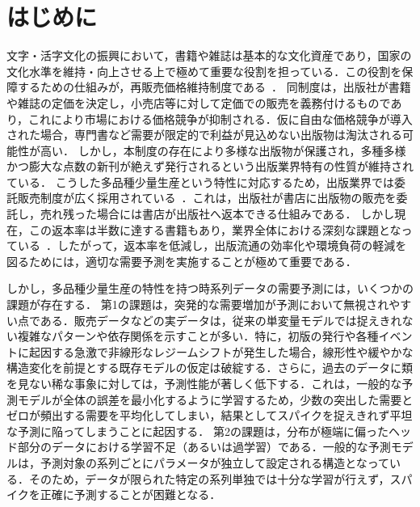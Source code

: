 \documentclass[twocolumn, lastpage]{jarticle}
\begin{document}
\normalsize
\setcounter{page}{1}%
\setcounter{secondpage}{1} %
\maketitle





\section{はじめに}
文字・活字文化の振興において，書籍や雑誌は基本的な文化資産であり，国家の文化水準を維持・向上させる上で極めて重要な役割を担っている．この役割を保障するための仕組みが，再販売価格維持制度である~\cite{JBPA.2001, Kiyota.2002}．
同制度は，出版社が書籍や雑誌の定価を決定し，小売店等に対して定価での販売を義務付けるものであり，これにより市場における価格競争が抑制される．仮に自由な価格競争が導入された場合，専門書など需要が限定的で利益が見込めない出版物は淘汰される可能性が高い．
しかし，本制度の存在により多様な出版物が保護され，多種多様かつ膨大な点数の新刊が絶えず発行されるという出版業界特有の性質が維持されている．
こうした多品種少量生産という特性に対応するため，出版業界では委託販売制度が広く採用されている~\cite{Shimomura.2005}．これは，出版社が書店に出版物の販売を委託し，売れ残った場合には書店が出版社へ返本できる仕組みである．
しかし現在，この返本率は半数に達する書籍もあり，業界全体における深刻な課題となっている~\cite{Shuppan.2024}．したがって，返本率を低減し，出版流通の効率化や環境負荷の軽減を図るためには，適切な需要予測を実施することが極めて重要である．

しかし，多品種少量生産の特性を持つ時系列データの需要予測には，いくつかの課題が存在する．
第1の課題は，突発的な需要増加が予測において無視されやすい点である．販売データなどの実データは，従来の単変量モデルでは捉えきれない複雑なパターンや依存関係を示すことが多い．特に，初版の発行や各種イベントに起因する急激で非線形なレジームシフトが発生した場合，線形性や緩やかな構造変化を前提とする既存モデルの仮定は破綻する．さらに，過去のデータに類を見ない稀な事象に対しては，予測性能が著しく低下する．これは，一般的な予測モデルが全体の誤差を最小化するように学習するため，少数の突出した需要とゼロが頻出する需要を平均化してしまい，結果としてスパイクを捉えきれず平坦な予測に陥ってしまうことに起因する．
第2の課題は，分布が極端に偏ったヘッド部分のデータにおける学習不足（あるいは過学習）である．一般的な予測モデルは，予測対象の系列ごとにパラメータが独立して設定される構造となっている．そのため，データが限られた特定の系列単独では十分な学習が行えず，スパイクを正確に予測することが困難となる．
\end{document}
